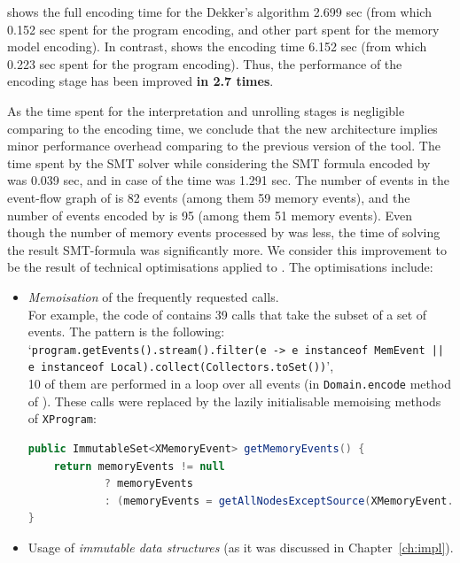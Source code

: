 \porthos[2] shows the full encoding time for the Dekker's algorithm 2.699 sec (from which 0.152 sec spent for the program encoding, and other part spent for the memory model encoding).
In contrast, \porthos[1] shows the encoding time 6.152 sec (from which 0.223 sec spent for the program encoding). %
Thus, the performance of the encoding stage has been improved \textbf{in 2.7 times}.

As the time spent for the interpretation and unrolling stages is negligible comparing to the encoding time, we conclude that the new architecture implies minor performance overhead comparing to the previous version of the tool.
The time spent by the SMT solver while considering the SMT formula encoded by \porthos[2] was 0.039 sec, and in case of \porthos[1] the time was 1.291 sec.
The number of events in the event-flow graph of \porthos[2] is 82 events (among them 59 memory events), and the number of events encoded by \porthos[1] is 95 (among them 51 memory events).
Even though the number of memory events processed by \porthos[1] was less, the time of solving the result SMT-formula was significantly more.
We consider this improvement to be the result of technical optimisations applied to \porthos[2].
The optimisations include:
\begin{itemize}
\item \textit{Memoisation} of the frequently requested calls. \\
    For example, the code of \porthos[1] contains 39 calls that take the subset of a set of events. The pattern is the following: `\lstinline{program.getEvents().stream().filter(e -> e instanceof MemEvent || e instanceof Local).collect(Collectors.toSet())}', \\
    10 of them are performed in a loop over all events (in \texttt{Domain.encode} method of \porthos[2]).
    These calls were replaced by the lazily initialisable memoising methods of \texttt{XProgram}: \\
\begin{lstlisting}[language=Java]
public ImmutableSet<XMemoryEvent> getMemoryEvents() {
    return memoryEvents != null
            ? memoryEvents
            : (memoryEvents = getAllNodesExceptSource(XMemoryEvent.class));
}
\end{lstlisting}
\item Usage of \textit{immutable data structures} (as it was discussed in Chapter~\ref{ch:impl}).
\end{itemize}

